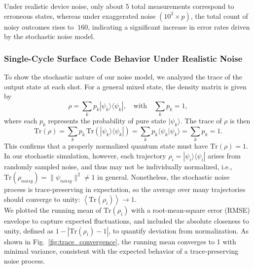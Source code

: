 \documentclass[9pt,a4paper,twocolumn,twoside]{tau-class/tau}
\begin{document}
Under realistic device noise, only about 5 total measurements correspond to erroneous states, whereas under exaggerated noise \( (10^3 \times p) \), the total count of noisy outcomes rises to \(~160\), indicating a significant increase in error rates driven by the stochastic noise model.
\subsubsection*{Single-Cycle Surface Code Behavior Under Realistic Noise}
To show the stochastic nature of our noise model, we analyzed the trace of the output state at each shot. For a general mixed state, the density matrix is given by
\begin{equation}
\rho = \sum_k p_k |\psi_k\rangle \langle \psi_k|, \quad \text{with} \quad \sum_k p_k = 1,
\end{equation}
where each \( p_k \) represents the probability of pure state \( |\psi_k\rangle \). The trace of \( \rho \) is then
\begin{equation}   
\mathrm{Tr}(\rho) = \sum_k p_k \, \mathrm{Tr}(|\psi_k\rangle \langle \psi_k|) = \sum_k p_k \langle \psi_k | \psi_k \rangle = \sum_k p_k = 1.
\end{equation}
This confirms that a properly normalized quantum state must have \( \mathrm{Tr}(\rho) = 1 \). In our stochastic simulation, however, each trajectory \( \rho_i = |\psi_i\rangle \langle \psi_i| \) arises from randomly sampled noise, and thus may not be individually normalized, i.e., \( \mathrm{Tr}(\rho_{noisy}) = \|\psi_{noisy}\|^2 \neq 1 \) in general. Nonetheless, the stochastic noise process is trace-preserving in expectation, so the average over many trajectories should converge to unity: \(\left\langle \mathrm{Tr}(\rho_i) \right\rangle \to 1.\)\\
We plotted the running mean of \( \mathrm{Tr}(\rho_i) \) with a root-mean-square error (RMSE) envelope to capture expected fluctuations, and included the absolute closeness to unity, defined as \( 1 - |\mathrm{Tr}(\rho_i) - 1| \), to quantify deviation from normalization. As shown in Fig.~\ref{fig:trace_convergence}, the running mean converges to 1 with minimal variance, consistent with the expected behavior of a trace-preserving noise process.
\end{document}
